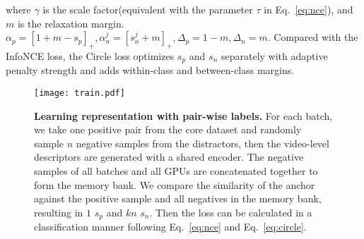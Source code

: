 \documentclass[10pt,twocolumn,letterpaper]{article}
\begin{document}
where $\gamma$ is the scale factor(equivalent with the parameter $\tau$ in Eq.~\ref{eq:nce}), and $m$ is the relaxation margin. $\alpha_{p} = \left[ 1 + m - s_{p} \right]_{+}, \alpha_{n}^{j} = \left[ s_{n}^{j} + m\right]_{+}, \Delta_{p} = 1 - m, \Delta_{n} = m$. Compared with the InfoNCE loss, the Circle loss optimizes $s_p$ and $s_n$ separately with adaptive penalty strength and adds within-class and between-class margins. 

\begin{figure}[t]
    \centering
    \texttt{[image: train.pdf]}
    \caption{\textbf{Learning representation with pair-wise labels.} For each batch, we take one positive pair from the core dataset and randomly sample $n$ negative samples from the distractors, then the video-level descriptors are generated with a shared encoder. The negative samples of all batches and all GPUs are concatenated together to form the memory bank. We compare the similarity of the anchor against the positive sample and all negatives in the memory bank, resulting in $1$ $s_p$ and $kn$ $s_n$. Then the loss can be calculated in a classification manner following Eq.~\ref{eq:nce} and Eq.~\ref{eq:circle}.}
\label{fig:contrast}
\end{figure}
\end{document}
